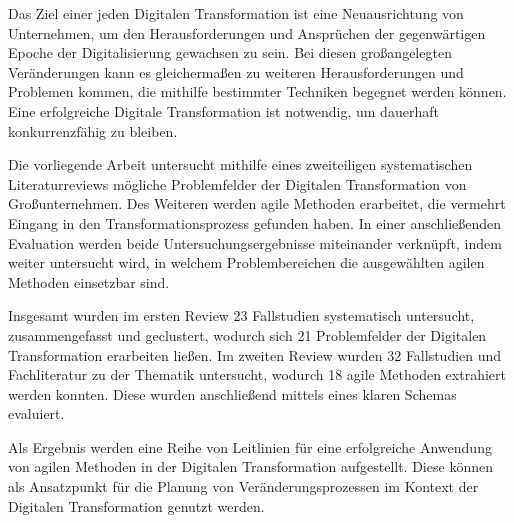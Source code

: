 
Das Ziel einer jeden Digitalen Transformation ist eine Neuausrichtung von Unternehmen, um den Herausforderungen und Ansprüchen der gegenwärtigen Epoche der Digitalisierung gewachsen zu sein. Bei diesen großangelegten Veränderungen kann es gleichermaßen zu weiteren Herausforderungen und Problemen kommen, die mithilfe bestimmter Techniken begegnet werden können. Eine erfolgreiche Digitale Transformation ist notwendig, um dauerhaft konkurrenzfähig zu bleiben. 

Die vorliegende Arbeit untersucht mithilfe eines zweiteiligen systematischen Literaturreviews mögliche Problemfelder der Digitalen Transformation von Großunternehmen. Des Weiteren werden agile Methoden erarbeitet, die vermehrt Eingang in den Transformationsprozess gefunden haben. In einer anschließenden Evaluation werden beide Untersuchungsergebnisse miteinander verknüpft, indem weiter untersucht wird, in welchem Problembereichen die ausgewählten agilen Methoden einsetzbar sind.

Insgesamt wurden im ersten Review 23 Fallstudien systematisch untersucht, zusammengefasst und geclustert, wodurch sich 21 Problemfelder der Digitalen Transformation erarbeiten ließen. Im zweiten Review wurden 32 Fallstudien und Fachliteratur zu der Thematik untersucht, wodurch 18 agile Methoden extrahiert werden konnten. Diese wurden anschließend mittels eines klaren Schemas evaluiert.

Als Ergebnis werden eine Reihe von Leitlinien für eine erfolgreiche Anwendung von agilen Methoden in der Digitalen Transformation aufgestellt. Diese können als Ansatzpunkt für die Planung von Veränderungsprozessen im Kontext der Digitalen Transformation genutzt werden.
